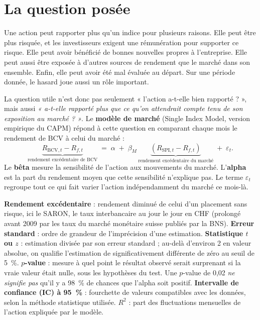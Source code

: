 \documentclass[11pt,a4paper]{article}
\begin{document}
\section{La question posée}

Une action peut rapporter plus qu'un indice pour plusieurs raisons. Elle peut être plus risquée, et les investisseurs exigent une rémunération pour supporter ce risque. Elle peut avoir bénéficié de bonnes nouvelles propres à l'entreprise. Elle peut aussi être exposée à d'autres sources de rendement que le marché dans son ensemble. Enfin, elle peut avoir été mal évaluée au départ. Sur une période donnée, le hasard joue aussi un rôle important.

La question utile n'est donc pas seulement « l'action a-t-elle bien rapporté ? », mais aussi \emph{« a-t-elle rapporté plus que ce qu'on attendrait compte tenu de son exposition au marché ? »}. Le \textbf{modèle de marché} (Single Index Model, version empirique du CAPM) répond à cette question en comparant chaque mois le rendement de BCV à celui du marché :
\[
  \underbrace{R_{\text{BCV},t} - R_{f,t}}_{\text{rendement excédentaire de BCV}}
  \;=\; \alpha \;+\; \beta_M \,\underbrace{\left(R_{\text{SPI},t} - R_{f,t}\right)}_{\text{rendement excédentaire du marché}} \;+\; \varepsilon_t .
\]
Le \textbf{bêta} mesure la sensibilité de l'action aux mouvements du marché. L'\textbf{alpha} est la part du rendement moyen que cette sensibilité n'explique pas. Le terme $\varepsilon_t$ regroupe tout ce qui fait varier l'action indépendamment du marché ce mois-là.

\begin{lexique}\small
\textbf{Rendement excédentaire} : rendement diminué de celui d'un placement sans risque, ici le SARON, le taux interbancaire au jour le jour en CHF (prolongé avant 2009 par les taux du marché monétaire suisse publiés par la BNS). \textbf{Erreur standard} : ordre de grandeur de l'imprécision d'une estimation. \textbf{Statistique $t$ ou $z$} : estimation divisée par son erreur standard ; au-delà d'environ 2 en valeur absolue, on qualifie l'estimation de significativement différente de zéro au seuil de 5~\%. \textbf{$p$-value} : mesure à quel point le résultat observé serait surprenant si la vraie valeur était nulle, sous les hypothèses du test. Une $p$-value de 0,02 \emph{ne signifie pas} qu'il y a 98~\% de chances que l'alpha soit positif. \textbf{Intervalle de confiance (IC) à 95~\%} : fourchette de valeurs compatibles avec les données, selon la méthode statistique utilisée. \textbf{$R^2$} : part des fluctuations mensuelles de l'action expliquée par le modèle.
\end{lexique}
\end{document}
